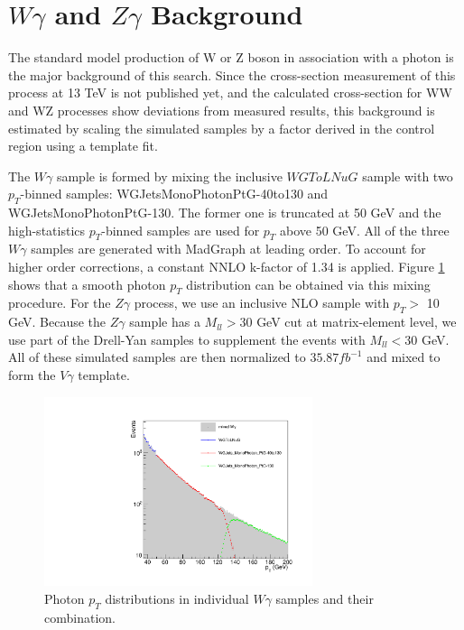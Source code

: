 \documentclass[thesis.tex]{subfiles}
\renewcommand\_{\textunderscore\allowbreak}
\begin{document}
\section{$W\gamma$ and $Z\gamma$ Background}\label{sec:VG}
The standard model production of W or Z boson in association with a photon is the major background of this search. Since the cross-section measurement of this process at 13 TeV is not published yet, and the calculated cross-section for WW and WZ processes show deviations from measured results, this background is estimated by scaling the simulated samples by a factor derived in the control region using a template fit. 

The $W\gamma$ sample is formed by mixing the inclusive $WGToLNuG$ sample with two $p_T$-binned samples: WGJets\_MonoPhoton\_PtG-40to130 and WGJets\_MonoPhoton\_PtG-130. The former one is truncated at 50 GeV and the high-statistics $p_T$-binned samples are used for $p_T$ above 50 GeV. All of the three $W\gamma$ samples are generated with MadGraph at leading order. To account for higher order corrections, a constant NNLO k-factor of 1.34 is applied. Figure \ref{fig:mixWG} shows that a smooth photon $p_{T}$ distribution can be obtained via this mixing procedure. For the $Z\gamma$ process, we use an inclusive NLO sample with $p_T >$ 10 GeV. Because the $Z\gamma$ sample has a $M_{ll} > 30$ GeV cut at matrix-element level, we use part of the Drell-Yan samples to supplement the events with $M_{ll} < 30$ GeV. All of these simulated samples are then normalized to $35.87 fb^{-1}$ and mixed to form the $V\gamma$ template.

\begin{figure}[!hbt]
  \centering
    \includegraphics[width=0.7\textwidth]{Figures/WGMixing.pdf}
  \caption{Photon $p_T$ distributions in individual $W\gamma$ samples and their combination.}
    \label{fig:mixWG}
\end{figure}
\end{document}
